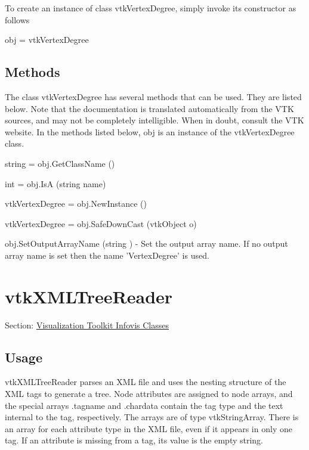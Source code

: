 To create an instance of class vtk\-Vertex\-Degree, simply invoke its constructor as follows \begin{DoxyVerb}  obj = vtkVertexDegree
\end{DoxyVerb}
 \hypertarget{vtkwidgets_vtkxyplotwidget_Methods}{}\subsection{Methods}\label{vtkwidgets_vtkxyplotwidget_Methods}
The class vtk\-Vertex\-Degree has several methods that can be used. They are listed below. Note that the documentation is translated automatically from the V\-T\-K sources, and may not be completely intelligible. When in doubt, consult the V\-T\-K website. In the methods listed below, {\ttfamily obj} is an instance of the vtk\-Vertex\-Degree class. 
\begin{DoxyItemize}
\item {\ttfamily string = obj.\-Get\-Class\-Name ()}  
\item {\ttfamily int = obj.\-Is\-A (string name)}  
\item {\ttfamily vtk\-Vertex\-Degree = obj.\-New\-Instance ()}  
\item {\ttfamily vtk\-Vertex\-Degree = obj.\-Safe\-Down\-Cast (vtk\-Object o)}  
\item {\ttfamily obj.\-Set\-Output\-Array\-Name (string )} -\/ Set the output array name. If no output array name is set then the name 'Vertex\-Degree' is used.  
\end{DoxyItemize}\hypertarget{vtkinfovis_vtkxmltreereader}{}\section{vtk\-X\-M\-L\-Tree\-Reader}\label{vtkinfovis_vtkxmltreereader}
Section\-: \hyperlink{sec_vtkinfovis}{Visualization Toolkit Infovis Classes} \hypertarget{vtkwidgets_vtkxyplotwidget_Usage}{}\subsection{Usage}\label{vtkwidgets_vtkxyplotwidget_Usage}
vtk\-X\-M\-L\-Tree\-Reader parses an X\-M\-L file and uses the nesting structure of the X\-M\-L tags to generate a tree. Node attributes are assigned to node arrays, and the special arrays .tagname and .chardata contain the tag type and the text internal to the tag, respectively. The arrays are of type vtk\-String\-Array. There is an array for each attribute type in the X\-M\-L file, even if it appears in only one tag. If an attribute is missing from a tag, its value is the empty string.

